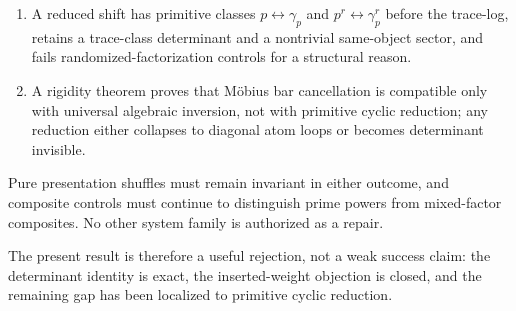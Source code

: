 \begin{enumerate}
\item A reduced shift has primitive classes
$p\leftrightarrow\gamma_p$ and
$p^r\leftrightarrow\gamma_p^r$ before the trace-log, retains a
trace-class determinant and a nontrivial same-object sector, and fails
randomized-factorization controls for a structural reason.
\item A rigidity theorem proves that M\"obius bar cancellation is compatible
only with universal algebraic inversion, not with primitive cyclic reduction;
any reduction either collapses to diagonal atom loops or becomes determinant
invisible.
\end{enumerate}

Pure presentation shuffles must remain invariant in either outcome, and
composite controls must continue to distinguish prime powers from
mixed-factor composites.  No other system family is authorized as a repair.

The present result is therefore a useful rejection, not a weak success claim:
the determinant identity is exact, the inserted-weight objection is closed,
and the remaining gap has been localized to primitive cyclic reduction.
